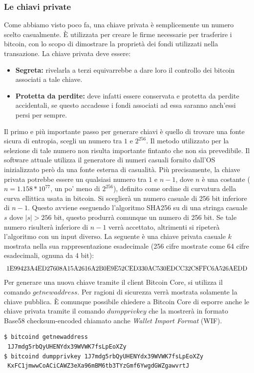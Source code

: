 \subsubsection{Le chiavi private}
Come abbiamo visto poco fa, una chiave privata è semplicemente un numero scelto casualmente. \`E utilizzata per creare le firme necessarie per trasferire i bitcoin, con lo scopo di dimostrare la proprietà dei fondi utilizzati nella transazione. La chiave privata deve essere:
\begin{itemize}
	\item \textbf{Segreta:} rivelarla a terzi equivarrebbe a dare loro il controllo dei bitcoin associati a tale chiave.
	\item \textbf{Protetta da perdite:} deve infatti essere conservata e protetta da perdite accidentali, se questo accadesse i fondi associati ad essa saranno anch'essi persi per sempre.
\end{itemize}
Il primo e più importante passo per generare chiavi è quello di trovare una fonte sicura di entropia, scegli un numero tra $1$ e $2^{256}$. Il metodo utilizzato per la selezione di tale numero non risulta importante fintanto che non sia prevedibile. Il software attuale utilizza il generatore di numeri casuali fornito dall'OS inizializzato però da una fonte esterna di casualità. Più precisamente, la chiave privata potrebbe essere un qualsiasi numero tra $1$ e $n-1$, dove $n$ è una costante ($n=1.158*10^{77}$, un po' meno di $2^{256}$), definito come ordine di curvatura della curva ellittica usata in bitcoin. Si sceglierà un numero casuale di 256 bit inferiore di $n-1$. Questo avviene eseguendo l'algoritmo SHA256 su di una stringa casuale $s$ dove $|s|>256$ bit, questo produrrà comunque un numero di 256 bit. Se tale numero risulterà inferiore di $n-1$ verrà accettato, altrimenti si ripeterà l'algoritmo con un input diverso. La seguente è una chiave privata casuale $k$ mostrata nella sua rappresentazione esadecimale (256 cifre mostrate come 64 cifre esadecimali, ognuna da 4 bit):
\[\text{\small 1E99423A4ED27608A15A2616A2B0E9E52CED330AC530EDCC32C8FFC6A526AEDD}\]
Per generare una nuova chiave tramite il client Bitcoin Core, si utilizza il comando $getnewaddress$. Per ragioni di sicurezza verrà mostrata solamente la chiave pubblica. \`E comunque possibile chiedere a Bitcoin Core di esporre anche le chiave privata tramite il comando $dumpprivkey$ che la mostrerà in formato Base58 checksum-encoded chiamato anche \textit{Wallet Import Format} (WIF).
\begin{lstlisting}
$ bitcoind getnewaddress
 1J7mdg5rbQyUHENYdx39WVWK7fsLpEoXZy
$ bitcoind dumpprivkey 1J7mdg5rbQyUHENYdx39WVWK7fsLpEoXZy
 KxFC1jmwwCoACiCAWZ3eXa96mBM6tb3TYzGmf6YwgdGWZgawvrtJ
\end{lstlisting}

